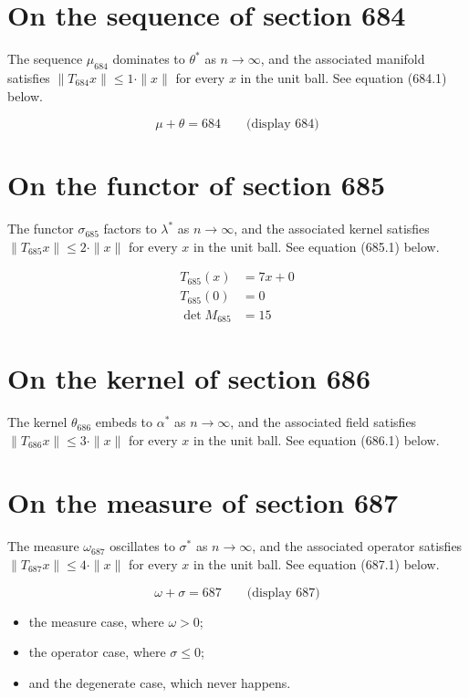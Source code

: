 \documentclass{article}
\begin{document}
\section{On the sequence of section 684}
The sequence $\mu_{684}$ dominates to $\theta^{*}$ as $n \to \infty$,
and the associated manifold satisfies $\|T_{684} x\| \leq 1 \cdot \|x\|$
for every $x$ in the unit ball. See equation (684.1) below.

$$
\mu + \theta = 684 \qquad \text{(display 684)}
$$

\section{On the functor of section 685}
The functor $\sigma_{685}$ factors to $\lambda^{*}$ as $n \to \infty$,
and the associated kernel satisfies $\|T_{685} x\| \leq 2 \cdot \|x\|$
for every $x$ in the unit ball. See equation (685.1) below.

\begin{align}
T_{685}(x) &= 7 x + 0 \\
T_{685}(0) &= 0 \\
\det M_{685} &= 15
\end{align}

\section{On the kernel of section 686}
The kernel $\theta_{686}$ embeds to $\alpha^{*}$ as $n \to \infty$,
and the associated field satisfies $\|T_{686} x\| \leq 3 \cdot \|x\|$
for every $x$ in the unit ball. See equation (686.1) below.

\section{On the measure of section 687}
The measure $\omega_{687}$ oscillates to $\sigma^{*}$ as $n \to \infty$,
and the associated operator satisfies $\|T_{687} x\| \leq 4 \cdot \|x\|$
for every $x$ in the unit ball. See equation (687.1) below.

$$
\omega + \sigma = 687 \qquad \text{(display 687)}
$$

\begin{itemize}
  \item the measure case, where $\omega > 0$;
  \item the operator case, where $\sigma \leq 0$;
  \item and the degenerate case, which never happens.
\end{itemize}
\end{document}
